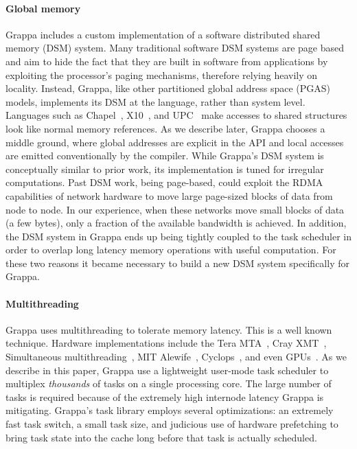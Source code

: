 \paragraph{Global memory} Grappa includes a custom implementation of a software distributed shared memory (DSM) system. Many traditional software DSM systems are page based~\cite{Treadmarks,munin} and aim to hide the fact that they are built in software from applications by exploiting the processor's paging mechanisms, therefore relying heavily on locality. Instead, Grappa, like other partitioned global address space (PGAS) models, implements its DSM at the language, rather than system level. Languages such as Chapel~\cite{Chamberlain:2007}, X10~\cite{X10:2005}, and UPC~\cite{upc:2005} make accesses to shared structures look like normal memory references. As we describe later, Grappa chooses a middle ground, where global addresses are explicit in the API and local accesses are emitted conventionally by the compiler.  While Grappa's DSM system is conceptually similar to prior work, its implementation is tuned for irregular computations.  Past DSM work, being page-based, could exploit the RDMA capabilities of network hardware to move large page-sized blocks of data from node to node. In our experience, when these networks move small blocks of data (a few bytes), only a fraction of the available bandwidth is achieved. In addition, the DSM system in Grappa ends up being tightly coupled to the task scheduler in order to overlap long latency memory operations with useful computation.  For these two reasons it became necessary to build a new DSM system specifically for Grappa.

\paragraph{Multithreading} Grappa uses multithreading to tolerate memory latency. This is a well known technique. Hardware implementations include the Tera MTA~\cite{tera:mta1}, Cray XMT~\cite{feo:xmt}, Simultaneous multithreading~\cite{tullsen:smt}, MIT Alewife~\cite{agarwal:alewife}, Cyclops~\cite{almasi:cyclops}, and even GPUs~\cite{gpus}. As we describe in this paper, Grappa use a lightweight user-mode task scheduler to multiplex \emph{thousands\/} of tasks on a single processing core. The large number of tasks is required because of the extremely high internode latency Grappa is mitigating.  Grappa's task library employs several optimizations: an extremely fast task switch, a small task size, and judicious use of hardware prefetching to bring task state into the cache long before that task is actually scheduled.

